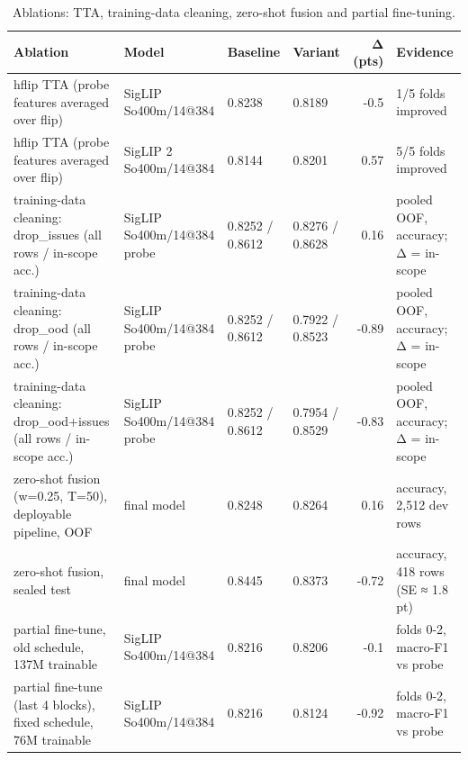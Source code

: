 \begin{table}[t]
\centering\small
\caption{Ablations: TTA, training-data cleaning, zero-shot fusion and partial fine-tuning.}
\label{tab:ablations}
\begin{tabular}{llllrl}
\toprule
Ablation & Model & Baseline & Variant & Δ (pts) & Evidence \\
\midrule
hflip TTA (probe features averaged over flip) & SigLIP So400m/14@384 & 0.8238 & 0.8189 & -0.5 & 1/5 folds improved \\
hflip TTA (probe features averaged over flip) & SigLIP 2 So400m/14@384 & 0.8144 & 0.8201 & 0.57 & 5/5 folds improved \\
training-data cleaning: drop\_issues (all rows / in-scope acc.) & SigLIP So400m/14@384 probe & 0.8252 / 0.8612 & 0.8276 / 0.8628 & 0.16 & pooled OOF, accuracy; Δ = in-scope \\
training-data cleaning: drop\_ood (all rows / in-scope acc.) & SigLIP So400m/14@384 probe & 0.8252 / 0.8612 & 0.7922 / 0.8523 & -0.89 & pooled OOF, accuracy; Δ = in-scope \\
training-data cleaning: drop\_ood+issues (all rows / in-scope acc.) & SigLIP So400m/14@384 probe & 0.8252 / 0.8612 & 0.7954 / 0.8529 & -0.83 & pooled OOF, accuracy; Δ = in-scope \\
zero-shot fusion (w=0.25, T=50), deployable pipeline, OOF & final model & 0.8248 & 0.8264 & 0.16 & accuracy, 2,512 dev rows \\
zero-shot fusion, sealed test & final model & 0.8445 & 0.8373 & -0.72 & accuracy, 418 rows (SE ≈ 1.8 pt) \\
partial fine-tune, old schedule, 137M trainable & SigLIP So400m/14@384 & 0.8216 & 0.8206 & -0.1 & folds 0-2, macro-F1 vs probe \\
partial fine-tune (last 4 blocks), fixed schedule, 76M trainable & SigLIP So400m/14@384 & 0.8216 & 0.8124 & -0.92 & folds 0-2, macro-F1 vs probe \\
\bottomrule
\end{tabular}
\end{table}
